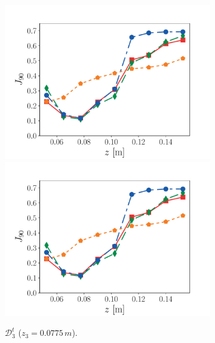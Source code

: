 \documentclass[review]{elsarticle}
\begin{document}
\begin{figure}[!tbp]%
  \centering%
  \begin{subfigure}[t]{0.32\textwidth}%
    \includegraphics[page=1,width=\textwidth]{./figs/dice_predictions_0004.pdf}\\%
    \includegraphics[page=2,width=\textwidth]{./figs/dice_predictions_0004.pdf}%
    \caption{$\mathcal{D}_3^t$ ($z_3=0.0775\,\unit{m}$).}\label{fig:gen_3}%
  \end{subfigure}\hfill%
  \begin{subfigure}[t]{0.32\textwidth}%

\end{subfigure}
\end{figure}
\end{document}
